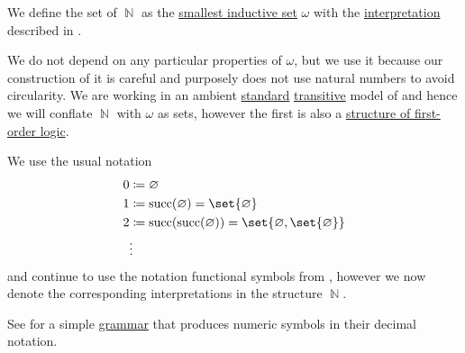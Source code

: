 \begin{definition}\label{def:set_of_natural_numbers}
  We define the set of  \( \BbbN \) as the \hyperref[thm:smallest_inductive_set_existence]{smallest inductive set} \( \omega \) with the \hyperref[def:first_order_structure/interpretation]{interpretation} described in .

  We do not depend on any particular properties of \( \omega \), but we use it because our construction of it is careful and purposely does not use natural numbers to avoid circularity. We are working in an ambient \hyperref[rem:standard_model_of_set_theory]{standard} \hyperref[rem:transitive_model_of_set_theory]{transitive} model of \hyperref[def:axiom_of_universes]{} and hence we will conflate \( \BbbN \) with \( \omega \) as sets, however the first is also a \hyperref[def:first_order_structure]{structure of first-order logic}.

  We use the usual notation
  \begin{align*}
    0 &\coloneqq \varnothing \\
    1 &\coloneqq \op{succ}(\varnothing) = \set{ \varnothing } \\
    2 &\coloneqq \op{succ}(\op{succ}(\varnothing)) = \set{ \varnothing, \set{ \varnothing } } \\
      &\vdots
  \end{align*}
  and continue to use the notation functional symbols from , however we now denote the corresponding interpretations in the structure \( \BbbN \).

  See  for a simple \hyperref[def:formal_grammar]{grammar} that produces numeric symbols in their decimal notation.
\end{definition}


